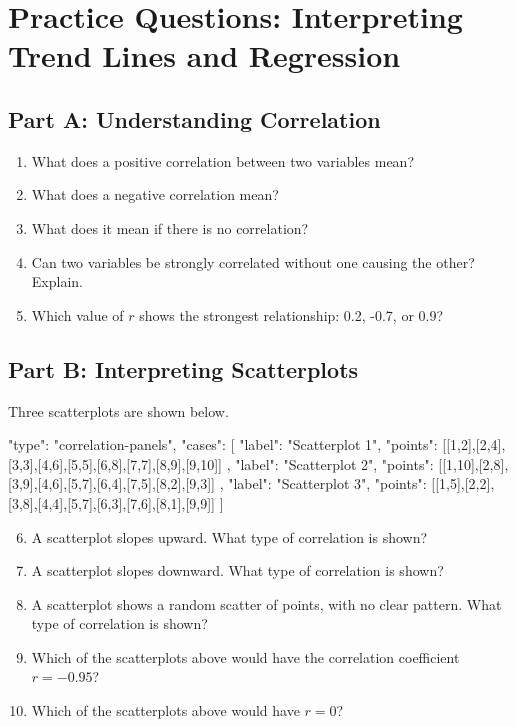 \documentclass[14pt]{extarticle}
\begin{document}
\section*{Practice Questions: Interpreting Trend Lines and Regression}

\subsection*{Part A: Understanding Correlation}
\begin{enumerate}
  \item What does a positive correlation between two variables mean?
  \item What does a negative correlation mean?
  \item What does it mean if there is no correlation?
  \item Can two variables be strongly correlated without one causing the other? Explain.
  \item Which value of \(r\) shows the strongest relationship: 0.2, -0.7, or 0.9?
\end{enumerate}

\subsection*{Part B: Interpreting Scatterplots}
Three scatterplots are shown below.

\begin{diagramdata}
{
  "type": "correlation-panels",
  "cases": [
    {
      "label": "Scatterplot 1",
      "points": [[1,2],[2,4],[3,3],[4,6],[5,5],[6,8],[7,7],[8,9],[9,10]]
    },
    {
      "label": "Scatterplot 2",
      "points": [[1,10],[2,8],[3,9],[4,6],[5,7],[6,4],[7,5],[8,2],[9,3]]
    },
    {
      "label": "Scatterplot 3",
      "points": [[1,5],[2,2],[3,8],[4,4],[5,7],[6,3],[7,6],[8,1],[9,9]]
    }
  ]
}
\end{diagramdata}

\begin{enumerate}
  \setcounter{enumi}{5}
  \item A scatterplot slopes upward. What type of correlation is shown?
  \item A scatterplot slopes downward. What type of correlation is shown?
  \item A scatterplot shows a random scatter of points, with no clear pattern. What type of correlation is shown?
  \item Which of the scatterplots above would have the correlation coefficient \(r = -0.95\)?
  \item Which of the scatterplots above would have \(r = 0\)?
\end{enumerate}
\end{document}
